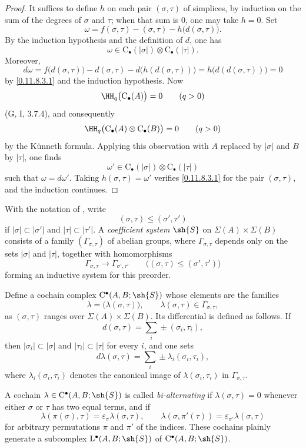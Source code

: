 \begin{proof}
It suffices to define $h$ on each pair $(\sigma,\tau)$ of simplices, by
induction on the sum of the degrees of $\sigma$ and $\tau$; when that sum
is $0$, one may take $h=0$.
Set
\[
  \omega
  =
  f(\sigma,\tau)-(\sigma,\tau)-h\bigl(d(\sigma,\tau)\bigr).
\]
By the induction hypothesis and the definition of $d$, one has
\[
  \omega
  \in
  \mathrm{C}_\bullet(|\sigma|)
  \otimes
  \mathrm{C}_\bullet(|\tau|).
\]
Moreover,
\[
  d\omega
  =
  f\bigl(d(\sigma,\tau)\bigr)
  -d(\sigma,\tau)
  -d\bigl(h(d(\sigma,\tau))\bigr)
  =
  h\bigl(d(d(\sigma,\tau))\bigr)
  =
  0
\]
by \eqref{0.11.8.3.1} and the induction hypothesis.
Now
\[
  \HH_q\bigl(\mathrm{C}_\bullet(A)\bigr)=0
  \qquad(q>0)
\]
(G, I, 3.7.4), and consequently
\[
  \HH_q\bigl(
    \mathrm{C}_\bullet(A)\otimes\mathrm{C}_\bullet(B)
  \bigr)=0
  \qquad(q>0)
\]
by the K\"unneth formula.
Applying this observation with $A$ replaced by $|\sigma|$ and $B$ by
$|\tau|$, one finds
\[
  \omega'
  \in
  \mathrm{C}_\bullet(|\sigma|)
  \otimes
  \mathrm{C}_\bullet(|\tau|)
\]
such that $\omega=d\omega'$.
Taking $h(\sigma,\tau)=\omega'$ verifies \eqref{0.11.8.3.1} for the pair
$(\sigma,\tau)$, and the induction continues.
\end{proof}

\begin{env}[11.8.4]
\label{0.11.8.4}
With the notation of , write
\[
  (\sigma,\tau)\leq(\sigma',\tau')
\]
if $|\sigma|\subset|\sigma'|$ and $|\tau|\subset|\tau'|$.
A \emph{coefficient system} $\sh{S}$ on
$\Sigma(A)\times\Sigma(B)$ consists of a family
$(\Gamma_{\sigma,\tau})$ of abelian groups, where
$\Gamma_{\sigma,\tau}$ depends only on the sets $|\sigma|$ and
$|\tau|$, together with homomorphisms
\[
  \Gamma_{\sigma,\tau}
  \longrightarrow
  \Gamma_{\sigma',\tau'}
  \qquad
  \bigl((\sigma,\tau)\leq(\sigma',\tau')\bigr)
\]
forming an inductive system for this preorder.

Define a cochain complex $\mathrm{C}^\bullet(A,B;\sh{S})$ whose elements
are the families
\[
  \lambda=\bigl(\lambda(\sigma,\tau)\bigr),
  \qquad
  \lambda(\sigma,\tau)\in\Gamma_{\sigma,\tau},
\]
as $(\sigma,\tau)$ ranges over $\Sigma(A)\times\Sigma(B)$.
Its differential is defined as follows.
If
\[
  d(\sigma,\tau)=\sum_i\pm(\sigma_i,\tau_i),
\]
then $|\sigma_i|\subset|\sigma|$ and $|\tau_i|\subset|\tau|$ for every
$i$, and one sets
\[
  d\lambda(\sigma,\tau)
  =
  \sum_i\pm\lambda_i(\sigma_i,\tau_i),
\]
where $\lambda_i(\sigma_i,\tau_i)$ denotes the canonical image of
$\lambda(\sigma_i,\tau_i)$ in $\Gamma_{\sigma,\tau}$.

A cochain $\lambda\in\mathrm{C}^\bullet(A,B;\sh{S})$ is called
\emph{bi-alternating} if $\lambda(\sigma,\tau)=0$ whenever either
$\sigma$ or $\tau$ has two equal terms, and if
\[
  \lambda(\pi(\sigma),\tau)
  =
  \varepsilon_\pi\lambda(\sigma,\tau),
  \qquad
  \lambda(\sigma,\pi'(\tau))
  =
  \varepsilon_{\pi'}\lambda(\sigma,\tau)
\]
for arbitrary permutations $\pi$ and $\pi'$ of the indices.
These cochains plainly generate a subcomplex
$\mathrm{L}^\bullet(A,B;\sh{S})$ of
$\mathrm{C}^\bullet(A,B;\sh{S})$.
\end{env}

